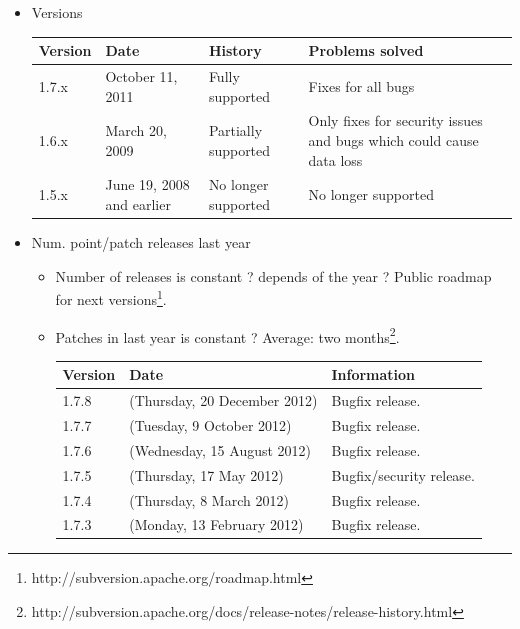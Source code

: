 \documentclass[11pt]{scrartcl}
\begin{document}
\begin{itemize}
    \item Versions

        \begin{table}[H]
        \centering
        \begin{tabular}{p{1cm} p{3cm} p{4cm} p{4cm}}
            \hline
                {\bf Version} & {\bf Date} & {\bf History} & {\bf Problems solved}\\
            \hline
                1.7.x & October 11, 2011 & Fully supported & Fixes for all bugs\\
            \hline
                1.6.x & March 20, 2009 & Partially supported & Only fixes for security issues and bugs which could cause data loss\\
            \hline
                1.5.x & June 19, 2008 and earlier & No longer supported & No longer supported\\
            \hline
        \end{tabular}
        \end{table}
    \item Num. point/patch releases last year
    \begin{itemize}
        \item Number of releases is constant ? depends of the year ? Public roadmap for next versions\footnote{http://subversion.apache.org/roadmap.html}.
        \item Patches in last year is constant ? Average: two months\footnote{http://subversion.apache.org/docs/release-notes/release-history.html}.

            \begin{table}[H]
            \centering
            \begin{tabular}{p{1.5cm} p{5.25cm} p{4cm}}
                \hline {\bf Version} & {\bf Date} & {\bf Information}\\
                \hline 1.7.8 & (Thursday, 20 December 2012) & Bugfix release.\\
                \hline 1.7.7 & (Tuesday, 9 October 2012) & Bugfix release.\\
                \hline 1.7.6 & (Wednesday, 15 August 2012) & Bugfix release.\\
                \hline 1.7.5 & (Thursday, 17 May 2012) & Bugfix/security release.\\
                \hline 1.7.4 & (Thursday, 8 March 2012) & Bugfix release.\\
                \hline 1.7.3 & (Monday, 13 February 2012) & Bugfix release.\\
                \hline
            \end{tabular}
            \end{table}
    \end{itemize}
\end{itemize}
\end{document}
